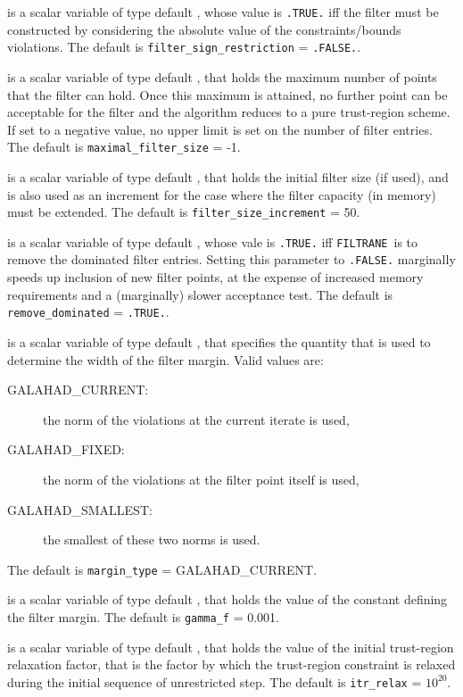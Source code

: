 \documentclass{galahad}
\newcommand{\packagename}{FILTRANE}
\newcommand{\sym}{\sf\small}
\newcommand{\filtrane}{{\tt \packagename}}
\begin{document}
\begin{description}
 is a scalar variable of type default \logical,
whose value is {\tt .TRUE.} iff the filter must be constructed by considering
the absolute value of the constraints/bounds violations.
The default is {\tt filter\_sign\_restriction} = {\tt .FALSE.}.

 is a scalar variable of type default \logical, that
holds the maximum number of points that the filter can hold. Once this maximum
is attained, no further point can be acceptable for the filter and the
algorithm reduces to a pure trust-region scheme.  If set to a negative value,
no upper limit is set on the number of filter entries.
The default is {\tt maximal\_filter\_size} = -1.

 is a scalar variable of type default \integer,
that holds the initial filter size (if used), and is also used as an increment
for the case where the filter capacity (in memory) must be extended.
The default is {\tt filter\_size\_increment} = 50.

 is a scalar variable of type default \logical, whose
vale is {\tt .TRUE.} iff \filtrane\ is to remove the dominated filter entries.
Setting this parameter to {\tt .FALSE.} marginally speeds up inclusion of new
filter points, at the expense of increased memory requirements and a
(marginally) slower acceptance test.
The default is {\tt remove\_dominated} = {\tt .TRUE.}.

 is a scalar variable of type default \integer, that
specifies the quantity that is used to determine the width of the filter
margin. Valid values are:
\begin{description}
\item[\sym GALAHAD\_CURRENT:] the norm of the violations at the current
iterate is used,
\item[\sym GALAHAD\_FIXED:] the norm of the violations at the filter point
itself is used,
\item[\sym GALAHAD\_SMALLEST:] the smallest of these two norms is used.
\end{description}
The default is {\tt margin\_type} = {\sym GALAHAD\_CURRENT}.

 is a scalar variable of type default \realdp, that holds the
value of the constant defining the filter margin.
The default is {\tt gamma\_f} = 0.001.

 is a scalar variable of type default \realdp, that holds the
value of the initial trust-region relaxation factor, that is the factor by
which the trust-region constraint is relaxed during the initial sequence of
unrestricted step.
The default is {\tt itr\_relax} = $10^{20}$.


\end{description}
\end{document}
